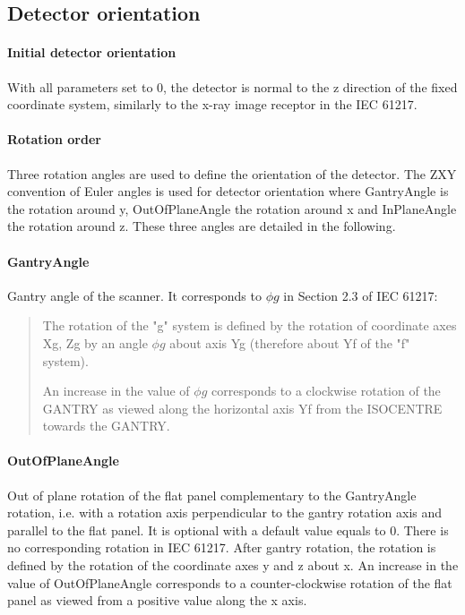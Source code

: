 \documentclass{article}
\newcommand{\biec}{\begin{quote}\begin{small}}
\newcommand{\eiec}{\end{small}\end{quote}}
\begin{document}
\subsection{Detector orientation}

\paragraph{Initial detector orientation}

With all parameters set to 0, the detector is normal to the z direction of the fixed coordinate system, similarly to the x-ray image receptor in the IEC 61217.

\paragraph{Rotation order} Three rotation angles are used to define the orientation of the detector. The ZXY convention of Euler angles is used for detector orientation where GantryAngle is the rotation around y, OutOfPlaneAngle the rotation around x and InPlaneAngle the rotation around z. These three angles are detailed in the following.

\paragraph{GantryAngle}

Gantry angle of the scanner. It corresponds to $\phi g$ in Section 2.3 of IEC 61217:

\biec
The rotation of the "g" system is defined by the rotation of coordinate axes Xg, Zg by an angle $\phi g$ about axis Yg (therefore about Yf of the "f" system).

An increase in the value of $\phi g$ corresponds to a clockwise rotation of the GANTRY as viewed along the horizontal axis Yf from the ISOCENTRE towards the GANTRY.
\eiec

\paragraph{OutOfPlaneAngle}

Out of plane rotation of the flat panel complementary to the GantryAngle rotation, i.e. with a rotation axis perpendicular to the gantry rotation axis and parallel to the flat panel. It is optional with a default value equals to 0. There is no corresponding rotation in IEC 61217. After gantry rotation, the rotation is defined by the rotation of the coordinate axes y and z about x. An increase in the value of OutOfPlaneAngle corresponds to a counter-clockwise rotation of the flat panel as viewed from a positive value along the x axis.
\end{document}
